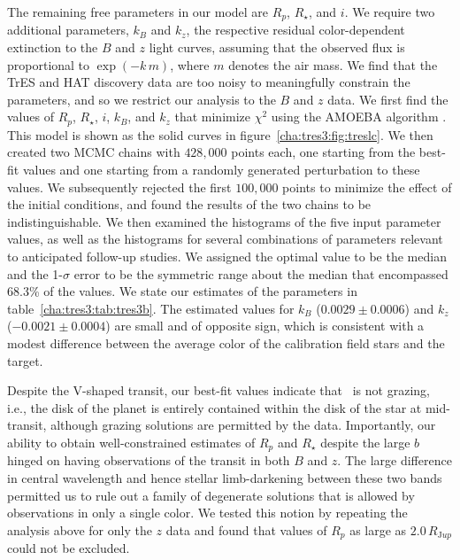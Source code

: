 The remaining free parameters in our model are $R_p$, $R_{\star}$, and $i$.
We require two additional parameters, $k_B$ and $k_z$, the respective residual color-dependent extinction to the $B$ and $z$ light curves, assuming that the observed flux is proportional to $\exp{(-k\, m)}$, where $m$ denotes the air mass.
We find that the TrES and HAT discovery data are too noisy to meaningfully constrain the parameters, and so we restrict our analysis to the $B$ and $z$ data.
We first find the values of $R_p$, $R_{\star}$, $i$, $k_B$, and $k_z$ that minimize ${\chi}^2$ using the AMOEBA algorithm \citep[][]{Press_Teukolsky_Vetterling:1992a}.
This model is shown as the solid curves in figure~\ref{cha:tres3:fig:treslc}.
We then created two MCMC chains with $428,\!000$ points each, one starting from the best-fit values and one starting from a randomly generated perturbation to these values.
We subsequently rejected the first $100,\!000$ points to minimize the effect of the initial conditions, and found the results of the two chains to be indistinguishable.
We then examined the histograms of the five input parameter values, as well as the histograms for several combinations of parameters relevant to anticipated follow-up studies.
We assigned the optimal value to be the median and the 1-$\sigma$ error to be the symmetric range about the median that encompassed 68.3\% of the values.
We state our estimates of the parameters in table~\ref{cha:tres3:tab:tres3b}.
The estimated values for $k_B$ ($0.0029 \pm 0.0006$) and $k_z$ ($-0.0021 \pm 0.0004$) are small and of opposite sign, which is consistent with a modest difference between the average color of the calibration field stars and the target.

Despite the V-shaped transit, our best-fit values indicate that  \tresThree\ is not grazing, i.e., the disk of the planet is entirely contained within the disk of the star at mid-transit, although grazing solutions are permitted by the data.
Importantly, our ability to obtain well-constrained estimates of $R_{p}$ and $R_{\star}$ despite the large $b$ hinged on having observations of the transit in both $B$ and $z$.
The large difference in central wavelength and hence stellar limb-darkening between these two bands permitted us to rule out a family of degenerate solutions that is allowed by observations in only a single color.
We tested this notion by repeating the analysis above for only the $z$ data and found that values of $R_p$ as large as $2.0\,R_{\mathrm Jup}$ could not be excluded.


